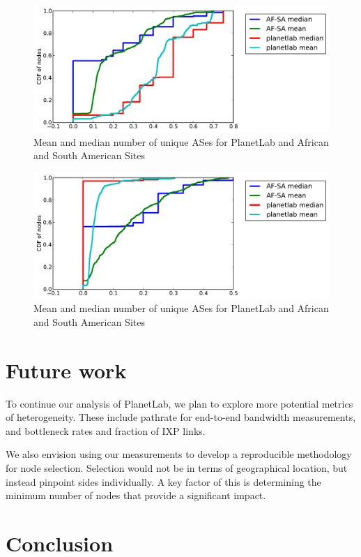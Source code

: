\documentclass{sig-alternate-10pt}
\begin{document}
\begin{figure}
\centering
    \includegraphics[width=1.0\linewidth]{figs/fractions_of_types-stp.pdf}
    \caption{Mean and median number of unique ASes for PlanetLab and African
and South American Sites}
\end{figure}

\begin{figure}
\centering
    \includegraphics[width=1.0\linewidth]{figs/fractions_of_types-tier1.pdf}
    \caption{Mean and median number of unique ASes for PlanetLab and African
and South American Sites}
\end{figure}


\section{Future work}

To continue our analysis of PlanetLab, we plan to explore more potential metrics
of heterogeneity. These include pathrate for end-to-end bandwidth measurements,
and bottleneck rates and fraction of IXP links. 

We also envision using our measurements to develop a reproducible methodology for
node selection. Selection would not be in terms of geographical location, but 
instead pinpoint sides individually. A key factor of this is determining the 
minimum number of nodes that  provide a significant impact.

\section{Conclusion}




\end{document}
